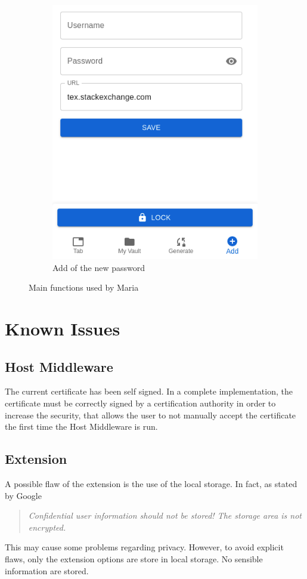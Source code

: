 \begin{enumerate}
\begin{figure}[H]
\begin{subfigure}{.5\textwidth}
			\includegraphics[width=.6\linewidth]{images/extension/add.png}
			\caption{Add of the new password}
			\label{fig:sub22}
		\end{subfigure}
		\caption{Main functions used by Maria}
		\label{fig:tes2t}
	\end{figure}
\end{enumerate}


\section{Known Issues}
\label{sec:know_issues}

\subsection{Host Middleware}
The current certificate has been self signed. In a complete implementation, the certificate must be correctly signed by a certification authority in order to increase the security, that allows the user to not manually accept the certificate the first time the Host Middleware is run.


\subsection{Extension}
\label{sec:extension}
A possible flaw of the extension is the use of the local storage. In fact, as stated by Google
\begin{quote}
    \textit{    Confidential user information should not be stored! The storage area is not encrypted.
    }
\end{quote}
This may cause some problems regarding privacy. However, to avoid explicit flaws, only the extension options are store in local storage. No sensible information are stored.
